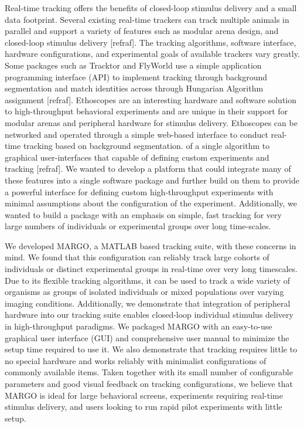 \documentclass[10pt]{article}
\begin{document}
\begin{multicols}{2}
Real-time tracking offers the benefits of closed-loop stimulus delivery and a small data footprint. Several existing real-time trackers can track multiple animals in parallel and support a variety of features such as modular arena design, and closed-loop stimulus delivery [refraf]. The tracking algorithms, software interface, hardware configurations, and experimental goals of available trackers vary greatly. Some packages such as Tracktor and FlyWorld use a simple application programming interface (API) to implement tracking through background segmentation and match identities across through Hungarian Algorithm assignment [refraf]. Ethoscopes are an interesting hardware and software solution to high-throughput behavioral experiments and are unique in their support for modular arenas and peripheral hardware for stimulus delivery. Ethoscopes can be networked and operated through a simple web-based interface to conduct real-time tracking based on background segmentation.  of a single algorithm to graphical user-interfaces that capable of defining custom experiments and tracking [refraf].   We wanted to develop a platform that could integrate many of these features into a single software package and further build on them to provide a powerful interface for defining custom high-throughput experiments with minimal assumptions about the configuration of the experiment. Additionally, we wanted to build a package with an emphasis on simple, fast tracking for very large numbers of individuals or experimental groups over long time-scales. 

We developed MARGO, a MATLAB based tracking suite, with these concerns in mind. We found that this configuration can reliably track large cohorts of individuals or distinct experimental groups in real-time over very long timescales. Due to its flexible tracking algorithms, it can be used to track a wide variety of organisms as groups of isolated individuals or mixed populations over varying imaging conditions. Additionally, we demonstrate that integration of peripheral hardware into our tracking suite enables closed-loop individual stimulus delivery in high-throughput paradigms. We packaged MARGO with an easy-to-use graphical user interface (GUI) and comprehensive user manual to minimize the setup time required to use it. We also demonstrate that tracking requires little to no special hardware and works reliably with minimalist configurations of commonly available items. Taken together with its small number of configurable parameters and good visual feedback on tracking configurations, we believe that MARGO is ideal for large behavioral screens, experiments requiring real-time stimulus delivery, and users looking to run rapid pilot experiments with little setup.


\end{multicols}
\end{document}
